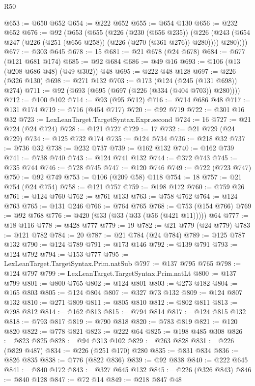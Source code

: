 \begin{lexlean}{R50}
\begin{coremodule}
@653 := @650 @652
@654 := @222 @652
@655 := @654 @130
@656 := @232 @652
@676 := @92
    (@653
      (@655
        (@226
          (@230 (@656 @235))
          (@226 (@243 (@654 @247 (@226 (@251 (@656 @258)) (@226 (@270 (@361 @276)) @280)))) @280))))
@677 := @303 @645
@678 := 15
@681 := @21 @678 (@24 @678)
@684 := @677 (@121 @681 @174)
@685 := @92 @684
@686 := @49 @16
@693 := @106 (@13 (@208 @686 @48) (@49 @302)) @48
@695 := @222 @48 @128
@697 := @226 (@326 @130)
@698 := @271 @132
@703 := @173 (@124 (@245 (@131 @698)) @274)
@711 := @92 (@693 (@695 (@697 (@226 (@334 (@404 @703)) @280))))
@712 := @100 @102
@714 := @93 (@95 @712)
@716 := @714 @686 @48
@717 := @131 @174
@719 := @716 (@454 @717)
@720 := @92 @719
@722 := @301 @16 @32
@723 := LexLeanTarget.TargetSyntax.Expr.second
@724 := 16
@727 := @21 @724 (@24 @724)
@728 := @121 @727
@729 := 17
@732 := @21 @729 (@24 @729)
@734 := @125 @732 @174
@735 := @124 @734
@736 := @218 @32
@737 := @736 @32
@738 := @232 @737
@739 := @162 @132
@740 := @162 @739
@741 := @738 @740
@743 := @124 @741 @132
@744 := @372 @743
@745 := @735 @744
@746 := @728 @745
@747 := @120 @746
@749 := @722 (@723 @747)
@750 := @92 @749
@753 := @106 (@209 @58) @118
@754 := 18
@757 := @21 @754 (@24 @754)
@758 := @121 @757
@759 := @198 @172
@760 := @759 @26
@761 := @124 @760
@762 := @761 @133
@763 := @758 @762
@764 := @124 @763
@765 := @131 @246
@766 := @764 @765
@768 := @753 (@154 @766)
@769 := @92 @768
@776 := @420 (@33 (@33 (@33 (@56 (@421 @11))))) @64
@777 := @18 @116
@778 := @428 @777
@779 := 19
@782 := @21 @779 (@24 @779)
@783 := @121 @782
@784 := 20
@787 := @21 @784 (@24 @784)
@789 := @125 @787 @132
@790 := @124 @789
@791 := @173 @146
@792 := @139 @791
@793 := @124 @792
@794 := @153 @777
@795 := LexLeanTarget.TargetSyntax.Prim.natSub
@797 := @137 @795 @765
@798 := @124 @797
@799 := LexLeanTarget.TargetSyntax.Prim.natLt
@800 := @137 @799
@801 := @800 @765
@802 := @124 @801
@803 := @273 @182
@804 := @165 @803
@805 := @124 @804
@807 := @327 @73 @132
@809 := @124 @807 @132
@810 := @271 @809
@811 := @805 @810
@812 := @802 @811
@813 := @798 @812
@814 := @162 @813
@815 := @794 @814
@817 := @124 @815 @132
@818 := @793 @817
@819 := @790 @818
@820 := @783 @819
@821 := @120 @820
@822 := @778 @821
@823 := @222 @64
@825 := @198 @485 @308
@826 := @823 @825
@828 := @94 @313 @102
@829 := @263 @828
@831 := @226 (@829 @487)
@834 := @226 (@251 @170) @280
@835 := @831 @834
@836 := @826 @835
@838 := @776 (@822 @836)
@839 := @92 @838
@840 := @222 @645
@841 := @840 @172
@843 := @327 @645 @132
@845 := @226 (@326 @843)
@846 := @840 @128
@847 := @72 @14
@849 := @218 @847 @48

\end{coremodule}
\end{lexlean}
